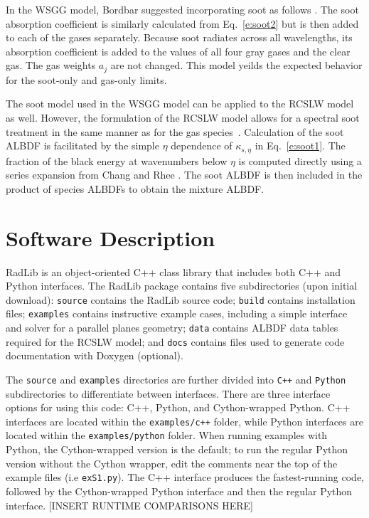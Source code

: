 \documentclass[preprint,12pt, a4paper]{elsarticle}
\begin{document}
In the WSGG model, Bordbar suggested incorporating soot as follows \cite{Bordbar_personal}. The soot absorption coefficient is similarly calculated from Eq.~\ref{e:soot2} but is then added to each of the gases separately. Because soot radiates across all wavelengths, its absorption coefficient is added to the values of all four gray gases and the clear gas. The gas weights $a_j$ are not changed. This model yeilds the expected behavior for the soot-only and gas-only limits.

The soot model used in the WSGG model can be applied to the RCSLW model as well. However, the formulation of the RCSLW model allows for a spectral soot treatment in the same manner as for the gas species~\cite{Solovjov_2001}. Calculation of the soot ALBDF is facilitated by the simple $\eta$ dependence of $\kappa_{s,\eta}$ in Eq.~\ref{e:soot1}. The fraction of the black energy at wavenumbers below $\eta$ is computed directly using a series expansion from Chang and Rhee \cite{Chang_1984,Solovjov_2001}. The soot ALBDF is then included in the product of species ALBDFs to obtain the mixture ALBDF. 
 

\section{Software Description} \label{s:architechture}

RadLib is an object-oriented C++ class library that includes both C++ and Python interfaces. The RadLib package contains five subdirectories (upon initial download): \texttt{source} contains the RadLib source code; \texttt{build} contains installation files; \texttt{examples} contains instructive example cases, including a simple interface and solver for a parallel planes geometry; \texttt{data} contains ALBDF data tables required for the RCSLW model; and \texttt{docs} contains files used to generate code documentation with Doxygen (optional). 

The \texttt{source} and \texttt{examples} directories are further divided into \texttt{C++} and \texttt{Python} subdirectories to differentiate between interfaces. There are three interface options for using this code: C++, Python, and Cython-wrapped Python. C++ interfaces are located within the \texttt{examples/c++} folder, while Python interfaces are located within the \texttt{examples/python} folder. When running examples with Python, the Cython-wrapped version is the default; to run the regular Python version without the Cython wrapper, edit the comments near the top of the example files (i.e \texttt{ex\textunderscore S1.py}). The C++ interface produces the fastest-running code, followed by the Cython-wrapped Python interface and then the regular Python interface. [INSERT RUNTIME COMPARISONS HERE]
\end{document}
